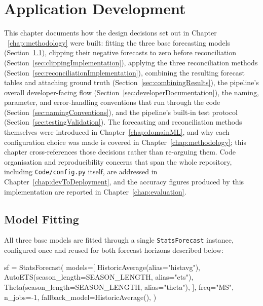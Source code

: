 %
%
%

\chapter{Application Development}
\label{chap:appDevelopment}

This chapter documents how the design decisions set out in Chapter ~\ref{chap:methodology} were built: fitting the three base forecasting models (Section~\ref{sec:modelFitting}), clipping their negative forecasts to zero before reconciliation (Section~\ref{sec:clippingImplementation}), applying the three reconciliation methods (Section~\ref{sec:reconciliationImplementation}), combining the resulting forecast tables and attaching ground truth (Section~\ref{sec:combiningResults}), the pipeline's overall developer-facing flow (Section~\ref{sec:developerDocumentation}), the naming, parameter, and error-handling conventions that run through the code (Section~\ref{sec:namingConventions}), and the pipeline's built-in test protocol (Section~\ref{sec:testingValidation}). The forecasting and reconciliation methods themselves were introduced in Chapter~\ref{chap:domainML}, and why each configuration choice was made is covered in Chapter~\ref{chap:methodology}; this chapter cross-references those decisions rather than re-arguing them. Code organisation and reproducibility concerns that span the whole repository, including \texttt{Code/config.py} itself, are addressed in Chapter~\ref{chap:devToDeployment}, and the accuracy figures produced by this implementation are reported in Chapter~\ref{chap:evaluation}.

\section{Model Fitting}
\label{sec:modelFitting}

All three base models are fitted through a single \texttt{StatsForecast} instance, configured once and reused for both forecast horizons described below:

\begin{Python}
	sf = StatsForecast(
	models=[
	HistoricAverage(alias="histavg"),
	AutoETS(season_length=SEASON_LENGTH, alias="ets"),
	Theta(season_length=SEASON_LENGTH, alias="theta"),
	],
	freq="MS",
	n_jobs=-1,
	fallback_model=HistoricAverage(),
	)
\end{Python}

